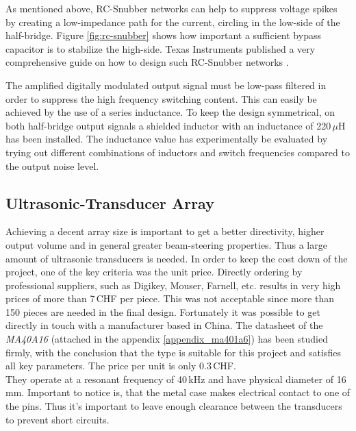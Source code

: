 As mentioned above, RC-Snubber networks can help to suppress voltage spikes by creating a low-impedance path for the current, circling in the low-side of the half-bridge. Figure \ref{fig:rc-snubber} shows how important a sufficient bypass capacitor is to stabilize the high-side. Texas Instruments published a very comprehensive guide on how to design such RC-Snubber networks \cite{ti_class_d_snubber_design}.

The amplified digitally modulated output signal must be low-pass filtered in order to suppress the high frequency switching content. This can easily be achieved by the use of a series inductance. To keep the design symmetrical, on both half-bridge output signals a shielded inductor with an inductance of 220\,$\mu$H has been installed. The inductance value has experimentally be evaluated by trying out different combinations of inductors and switch frequencies compared to the output noise level.

\subsection{Ultrasonic-Transducer Array}
Achieving a decent array size is important to get a better directivity, higher output volume and in general greater beam-steering properties. Thus a large amount of ultrasonic transducers is needed. In order to keep the cost down of the project, one of the key criteria was the unit price. Directly ordering by professional suppliers, such as Digikey, Mouser, Farnell, etc. results in very high prices of more than 7\,CHF per piece. This was not acceptable since more than 150 pieces are needed in the final design. Fortunately it was possible to get directly in touch with a manufacturer based in China. The datasheet of the \textit{MA40A16} (attached in the appendix \ref{appendix_ma401a6}) has been studied firmly, with the conclusion that the type is suitable for this project and satisfies all key parameters. The price per unit is only 0.3\,CHF.\\
They operate at a resonant frequency of 40\,kHz and have physical diameter of 16\,mm. Important to notice is, that the metal case makes electrical contact to one of the pins. Thus it's important to leave enough clearance between the transducers to prevent short circuits.

